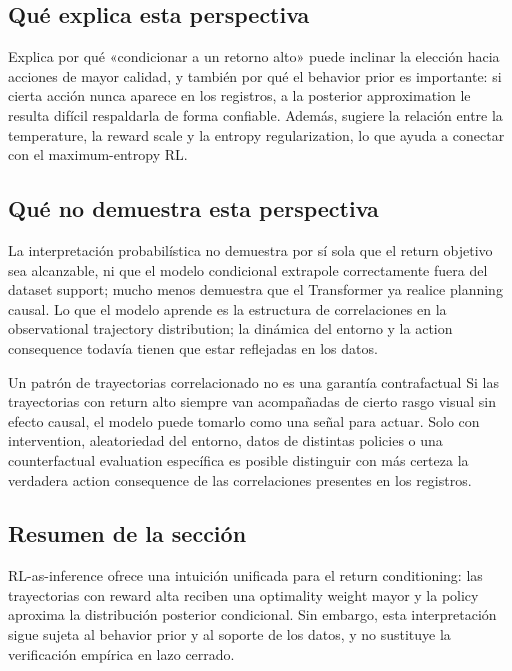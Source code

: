 \documentclass[a4paper]{article}
\begin{document}
\subsection{Qué explica esta perspectiva}

Explica por qué «condicionar a un retorno alto» puede inclinar la elección hacia acciones de mayor calidad, y también por qué el behavior prior es importante: si cierta acción nunca aparece en los registros, a la posterior approximation le resulta difícil respaldarla de forma confiable. Además, sugiere la relación entre la temperature, la reward scale y la entropy regularization, lo que ayuda a conectar con el maximum-entropy RL.

\subsection{Qué no demuestra esta perspectiva}

La interpretación probabilística no demuestra por sí sola que el return objetivo sea alcanzable, ni que el modelo condicional extrapole correctamente fuera del dataset support; mucho menos demuestra que el Transformer ya realice planning causal. Lo que el modelo aprende es la estructura de correlaciones en la observational trajectory distribution; la dinámica del entorno y la action consequence todavía tienen que estar reflejadas en los datos.

\begin{warningbox}{Un patrón de trayectorias correlacionado no es una garantía contrafactual}
Si las trayectorias con return alto siempre van acompañadas de cierto rasgo visual sin efecto causal, el modelo puede tomarlo como una señal para actuar. Solo con intervention, aleatoriedad del entorno, datos de distintas policies o una counterfactual evaluation específica es posible distinguir con más certeza la verdadera action consequence de las correlaciones presentes en los registros.
\end{warningbox}

\subsection{Resumen de la sección}

RL-as-inference ofrece una intuición unificada para el return conditioning: las trayectorias con reward alta reciben una optimality weight mayor y la policy aproxima la distribución posterior condicional. Sin embargo, esta interpretación sigue sujeta al behavior prior y al soporte de los datos, y no sustituye la verificación empírica en lazo cerrado.
\end{document}
